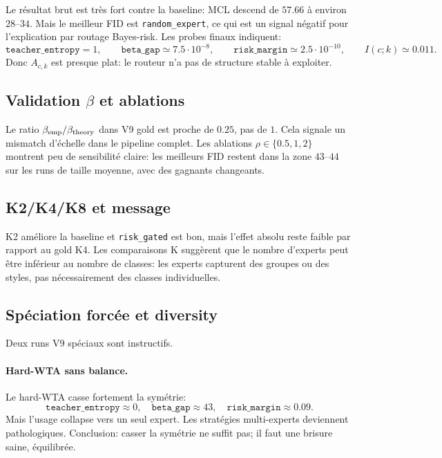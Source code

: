 \documentclass[11pt,a4paper]{article}
\newcommand{\1}{\mathbf{1}}
\begin{document}
Le résultat brut est très fort contre la baseline: MCL descend de $57.66$ à environ $28$--$34$. Mais le meilleur FID est \texttt{random\_expert}, ce qui est un signal négatif pour l'explication par routage Bayes-risk. Les probes finaux indiquent:
\[
\texttt{teacher\_entropy}=1,
\qquad
\texttt{beta\_gap}\simeq 7.5\cdot10^{-8},
\qquad
\texttt{risk\_margin}\simeq 2.5\cdot10^{-10},
\qquad
I(c;k)\simeq 0.011.
\]
Donc $A_{c,k}$ est presque plat: le routeur n'a pas de structure stable à exploiter.

\subsection{Validation $\beta$ et ablations}

Le ratio $\beta_{\rm emp}/\beta_{\rm theory}$ dans V9 gold est proche de $0.25$, pas de $1$. Cela signale un mismatch d'échelle dans le pipeline complet. Les ablations $\rho\in\{0.5,1,2\}$ montrent peu de sensibilité claire: les meilleurs FID restent dans la zone $43$--$44$ sur les runs de taille moyenne, avec des gagnants changeants.

\subsection{K2/K4/K8 et message}

K2 améliore la baseline et \texttt{risk\_gated} est bon, mais l'effet absolu reste faible par rapport au gold K4. Les comparaisons K suggèrent que le nombre d'experts peut être inférieur au nombre de classes: les experts capturent des groupes ou des styles, pas nécessairement des classes individuelles.

\subsection{Spéciation forcée et diversity}

Deux runs V9 spéciaux sont instructifs.

\paragraph{Hard-WTA sans balance.}
Le hard-WTA casse fortement la symétrie:
\[
\texttt{teacher\_entropy}\approx 0,
\quad
\texttt{beta\_gap}\approx 43,
\quad
\texttt{risk\_margin}\approx 0.09.
\]
Mais l'usage collapse vers un seul expert. Les stratégies multi-experts deviennent pathologiques. Conclusion: casser la symétrie ne suffit pas; il faut une brisure saine, équilibrée.
\end{document}
